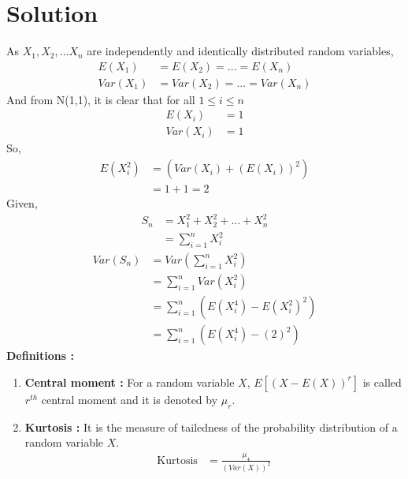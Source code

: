 \documentclass[journal,12pt,twocolumn]{IEEEtran}
\begin{document}
\section{Solution}
As $X_{1},X_{2},...X_n$ are independently and identically distributed random variables, \begin{align*}
    E(X_{1})&=E(X_{2})=...=E(X_n) \\
    Var(X_{1})&=Var(X_{2})=...=Var(X_n)
\end{align*}
And from N(1,1), it is clear that for all
$1 \leq i \leq n$
\begin{align*}
    E(X_{i}) &=1 \\
    Var(X_{i})&= 1  
\end{align*}
So,
\begin{align*}
    E(X_{i}^2)  &=  (  Var(X_i) + (E({X_i}))^2 )\\
    &=1+1 = 2
\end{align*}
Given,\begin{align*}
    S_{n} &= X_{1}^{2}+X_{2}^2+...+X_{n}^{2}\\
    &= \sum_{i=1}^n{X_{i}^2} 
    \end{align*}
       \begin{align}
    Var(S_n) &= Var\left( \sum_{i=1}^n{X_{i}^2}\right)\nonumber  \\
   &= \sum_{i=1}^n{ Var(X_{i}^2)}\nonumber \\
    &=\sum_{i=1}^n{\left(E(X_i^4)-E(X_i^2)^2\right)} \nonumber\\
    &= \sum_{i=1}^n{\left(E(X_i^4) - (2)^2\right)}\label{eq1}
\end{align}
\textbf{Definitions : } 
\begin{enumerate}
    \item \textbf{Central moment : } 
For a random variable $X$, $E\left[(X-E(X))^r\right]$ is called $r^{th} $ central moment and it is denoted by $\mu_r$.
\item \textbf{Kurtosis : } It is the measure of tailedness of the probability distribution of a random variable $X$.
\begin{align*}
    \text{Kurtosis} &= \frac{\mu_4}{( Var(X) )^2}
\end{align*}
\end{enumerate}
\end{document}
